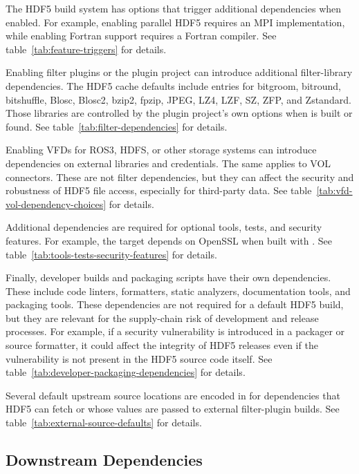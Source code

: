 \documentclass[../main.tex]{subfiles}
\begin{document}
The HDF5 build system has options that trigger additional dependencies when
enabled. For example, enabling parallel HDF5 requires an MPI implementation,
while enabling Fortran support requires a Fortran compiler.
See table~\ref{tab:feature-triggers} for details.

Enabling filter plugins or the plugin project can introduce additional
filter-library dependencies. The HDF5 cache defaults include entries for
bitgroom, bitround, bitshuffle, Blosc, Blosc2, bzip2, fpzip, JPEG, LZ4, LZF, SZ, ZFP, and Zstandard. Those libraries
are controlled by the plugin project's own options when 
is built or found. See table~\ref{tab:filter-dependencies} for details.

Enabling VFDs for ROS3, HDFS, or other storage systems can introduce dependencies on
external libraries and credentials. The same applies to VOL connectors.
These are not filter dependencies, but they can affect the security and
robustness of HDF5 file access, especially for third-party data.
See table~\ref{tab:vfd-vol-dependency-choices} for details.

Additional dependencies are required for optional tools, tests, and
security features. For example, the  target depends on
OpenSSL when built with .
See table~\ref{tab:tools-tests-security-features} for details.

Finally, developer builds and packaging scripts have their own dependencies. These include code linters, formatters,
static analyzers, documentation tools, and packaging tools. These dependencies  
are not required for a default HDF5 build, but they are relevant for
the supply-chain risk of development and release processes.
For example, if a security vulnerability is introduced in a packager or
source formatter, it could affect the integrity of HDF5 releases
even if the vulnerability is not present in the HDF5 source code itself.
See table~\ref{tab:developer-packaging-dependencies} for details.

Several default upstream source locations are encoded in
 for dependencies that HDF5 can fetch or whose
values are passed to external filter-plugin builds.
See table~\ref{tab:external-source-defaults} for details.

\subsection{Downstream Dependencies}
\end{document}
